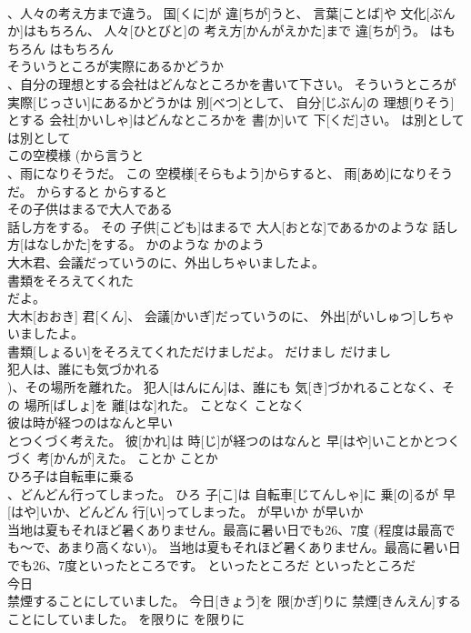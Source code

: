 \documentclass[8pt]{extreport}
\begin{document}
\begin{CJK}{UTF8}{min}
\\	、人々の考え方まで違う。	国[くに]が 違[ちが]うと、 言葉[ことば]や 文化[ぶんか]はもちろん、 人々[ひとびと]の 考え方[かんがえかた]まで 違[ちが]う。	はもちろん	はもちろん	
\\	そういうところが実際にあるかどうか 
\\	、自分の理想とする会社はどんなところかを書いて下さい。	そういうところが 実際[じっさい]にあるかどうかは 別[べつ]として、 自分[じぶん]の 理想[りそう]とする 会社[かいしゃ]はどんなところかを 書[か]いて 下[くだ]さい。	は別として	は別として	
\\	この空模様 (から言うと 
\\	、雨になりそうだ。	この 空模様[そらもよう]からすると、 雨[あめ]になりそうだ。	からすると	からすると	
\\	その子供はまるで大人である 
\\	話し方をする。	その 子供[こども]はまるで 大人[おとな]であるかのような 話し方[はなしかた]をする。	かのような	かのよう	
\\	大木君、会議だっていうのに、外出しちゃいましたよ。
\\	書類をそろえてくれた 
\\	だよ。	
\\	大木[おおき] 君[くん]、 会議[かいぎ]だっていうのに、 外出[がいしゅつ]しちゃいましたよ。
\\	書類[しょるい]をそろえてくれただけましだよ。	だけまし	だけまし	
\\	犯人は、誰にも気づかれる 
\\	[硬い言い方])、その場所を離れた。	犯人[はんにん]は、誰にも 気[き]づかれることなく、その 場所[ばしょ]を 離[はな]れた。	ことなく	ことなく	
\\	彼は時が経つのはなんと早い 
\\	とつくづく考えた。	彼[かれ]は 時[じ]が経つのはなんと 早[はや]いことかとつくづく 考[かんが]えた。	ことか	ことか	
\\	ひろ子は自転車に乗る 
\\	、どんどん行ってしまった。	ひろ 子[こ]は 自転車[じてんしゃ]に 乗[の]るが 早[はや]いか、どんどん 行[い]ってしまった。	が早いか	が早いか	
\\	当地は夏もそれほど暑くありません。最高に暑い日でも26、7度 (程度は最高でも～で、あまり高くない)。	当地は夏もそれほど暑くありません。最高に暑い日でも26、7度といったところです。	といったところだ	といったところだ	
\\	今日 
\\	禁煙することにしていました。	今日[きょう]を 限[かぎ]りに 禁煙[きんえん]することにしていました。	を限りに	を限りに	

\end{CJK}
\end{document}
